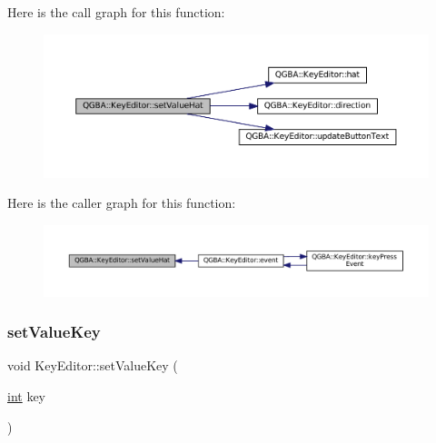 Here is the call graph for this function\+:
\nopagebreak
\begin{figure}[H]
\begin{center}
\leavevmode
\includegraphics[width=350pt]{class_q_g_b_a_1_1_key_editor_a3836e2a099626c0dfe682d63960c647d_cgraph}
\end{center}
\end{figure}
Here is the caller graph for this function\+:
\nopagebreak
\begin{figure}[H]
\begin{center}
\leavevmode
\includegraphics[width=350pt]{class_q_g_b_a_1_1_key_editor_a3836e2a099626c0dfe682d63960c647d_icgraph}
\end{center}
\end{figure}
\mbox{\label{class_q_g_b_a_1_1_key_editor_a80ecd8bd41c6e71f8907391aeb1b2976}} 
\subsubsection{\texorpdfstring{set\+Value\+Key}{setValueKey}}
{\footnotesize\ttfamily void Key\+Editor\+::set\+Value\+Key (\begin{DoxyParamCaption}\item[{\mbox{\hyperlink{ioapi_8h_a787fa3cf048117ba7123753c1e74fcd6}{int}}}]{key }\end{DoxyParamCaption})\hspace{0.3cm}{\ttfamily [slot]}}

